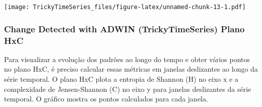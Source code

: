 \documentclass[
]{article}
\begin{document}
\texttt{[image: TrickyTimeSeries\_files/figure-latex/unnamed-chunk-13-1.pdf]}

\hypertarget{change-detected-with-adwin-trickytimeseries-plano-hxc}{%
\subsubsection{Change Detected with ADWIN (TrickyTimeSeries) Plano
HxC}\label{change-detected-with-adwin-trickytimeseries-plano-hxc}}

Para visualizar a evolução dos padrões ao longo do tempo e obter vários
pontos no plano HxC, é preciso calcular essas métricas em janelas
deslizantes ao longo da série temporal. O plano HxC plota a entropia de
Shannon (H) no eixo x e a complexidade de Jensen-Shannon (C) no eixo y
para janelas deslizantes da série temporal. O gráfico mostra os pontos
calculados para cada janela.
\end{document}
